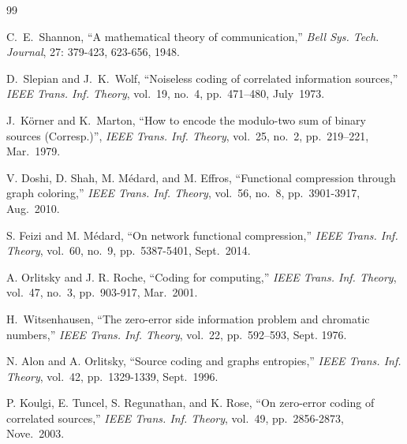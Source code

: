 \documentclass[11pt,draftclsnofoot,onecolumn]{IEEEtran}
\begin{document}
\begin{thebibliography}{99}

C.~E.~Shannon, ``A mathematical theory of communication,''
\textit{Bell Sys. Tech. Journal}, 27: 379-423, 623-656, 1948.


D.~Slepian and J.~K.~Wolf, ``Noiseless coding of correlated information sources,'' \textit{IEEE Trans. Inf. Theory}, vol.~19, no.~4, pp.~471--480, July~1973.



J.~K\"{o}rner and K.~Marton, ``How to encode the modulo-two sum of binary
sources (Corresp.)'', \textit{IEEE Trans. Inf. Theory}, vol.~25, no.~2, pp.~219--221,
Mar.~1979.


V. Doshi, D. Shah, M. M{\'e}dard, and M. Effros, ``Functional compression through graph coloring,''
    \textit{IEEE Trans. Inf. Theory}, vol.~56, no.~8, pp.~3901-3917, Aug.~2010.

S. Feizi and M. M{\'e}dard, ``On network functional compression,''
\textit{IEEE Trans. Inf. Theory}, vol.~60, no.~9, pp.~5387-5401, Sept.~2014.

A. Orlitsky and J. R. Roche, ``Coding for computing,''
     \textit{IEEE Trans. Inf. Theory}, vol.~47, no.~3, pp.~903-917, Mar.~2001.









H.~Witsenhausen, ``The zero-error side information problem and chromatic numbers,'' \textit{IEEE Trans. Inf. Theory}, vol.~22, pp.~592--593, Sept. 1976.


N. Alon and A. Orlitsky, ``Source coding and graphs entropies,''
    \textit{IEEE Trans. Inf. Theory}, vol.~42, pp.~1329-1339, Sept.~1996.

P. Koulgi, E. Tuncel, S. Regunathan, and K. Rose, ``On zero-error coding of correlated sources,''
    \textit{IEEE Trans. Inf. Theory}, vol.~49, pp.~2856-2873, Nove.~2003.


\end{thebibliography}
\end{document}
